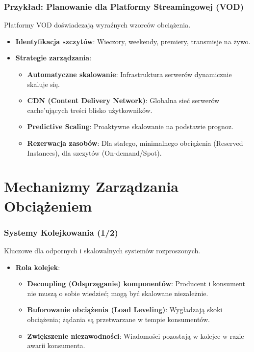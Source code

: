 \documentclass[aspectratio=169,xcolor=table]{beamer}
\begin{document}
\begin{frame}
  \frametitle{Przykład: Planowanie dla Platformy Streamingowej (VOD)}
  Platformy VOD doświadczają wyraźnych wzorców obciążenia.
  \begin{itemize}
    \item \textbf{Identyfikacja szczytów}: Wieczory, weekendy, premiery, transmisje na żywo.
    \item \textbf{Strategie zarządzania}:
        \begin{itemize}
            \item \textbf{Automatyczne skalowanie}: Infrastruktura serwerów dynamicznie skaluje się.
            \item \textbf{CDN (Content Delivery Network)}: Globalna sieć serwerów cache'ujących treści blisko użytkowników.
            \item \textbf{Predictive Scaling}: Proaktywne skalowanie na podstawie prognoz.
            \item \textbf{Rezerwacja zasobów}: Dla stałego, minimalnego obciążenia (Reserved Instances), dla szczytów (On-demand/Spot).
        \end{itemize}
  \end{itemize}
\end{frame}

\section{Mechanizmy Zarządzania Obciążeniem}

\begin{frame}
  \frametitle{Systemy Kolejkowania (1/2)}
  Kluczowe dla odpornych i skalowalnych systemów rozproszonych.
  \begin{itemize}
    \item \textbf{Rola kolejek}:
        \begin{itemize}
            \item \textbf{Decoupling (Odsprzęganie) komponentów}: Producent i konsument nie muszą o sobie wiedzieć; mogą być skalowane niezależnie.
            \item \textbf{Buforowanie obciążenia (Load Leveling)}: Wygładzają skoki obciążenia; żądania są przetwarzane w tempie konsumentów.
            \item \textbf{Zwiększenie niezawodności}: Wiadomości pozostają w kolejce w razie awarii konsumenta.
        \end{itemize}
  \end{itemize}
\end{frame}
\end{document}
